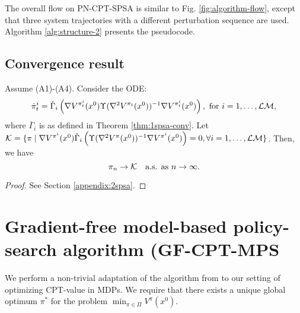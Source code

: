 \documentclass[11pt,letterpaper,english]{article}
\begin{document}
The overall flow on PN-CPT-SPSA is similar to Fig. \ref{fig:algorithm-flow}, except that three system trajectories with a different perturbation sequence are used. Algorithm \ref{alg:structure-2} presents the pseudocode.  

\subsection{Convergence result}
\begin{theorem}
\label{thm:2spsa}
Assume (A1)-(A4). 
Consider the ODE: 
$$
\dot\pi^{i}_t = \check\Gamma_{i}\left( \nabla V^{\pi^{i}_t}(x^0) \Upsilon(\nabla^2 V^{\pi_t}(x^0))^{-1} \nabla V^{\pi^{i}_t}(x^0) \right), \text { for }i=1,\dots,\mathcal{L}\mathcal{M},$$
where 
$\bar\Gamma_{i}$ is as defined in Theorem \ref{thm:1spsa-conv}. Let $\mathcal{K} = \{\pi \mid
\nabla V^{\pi^{i}}(x^0)  \check\Gamma_{i}\left(\Upsilon(\nabla^2 V^{\pi}(x^0))^{-1} \nabla V^{\pi^{i}}(x^0)\right)
=0, \forall i=1,\ldots,\mathcal{L}\mathcal{M}\}$. Then,
we have
$$\pi_n \rightarrow \mathcal{K}  \text{~~ a.s. as } n\rightarrow \infty.$$ 
\end{theorem}
\begin{proof}
 See Section \ref{appendix:2spsa}.
\end{proof}

\section{Gradient-free model-based policy-search algorithm (GF-CPT-MPS}
\label{sec:mras}
We perform a non-trivial adaptation of the algorithm from \cite{chang2013simulation} to our setting of optimizing CPT-value in MDPs.
We require that there exists a unique global optimum $\pi^*$ for the problem $\min_{\pi \in \Pi} V^\pi(x^0).$
\end{document}
